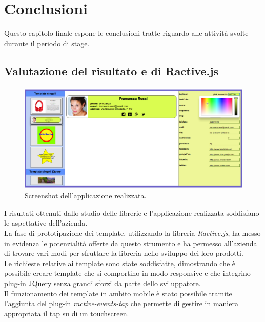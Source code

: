 
\chapter{Conclusioni}
\label{cap:conclusioni}

Questo capitolo finale espone le conclusioni tratte riguardo alle attività svolte durante il periodo di stage.

\section{Valutazione del risultato e di Ractive.js}
\begin{figure}[htp]
	\centering
	\includegraphics[scale=0.32]{../immagini/screenshot_app}
	\caption{Screenshot dell'applicazione realizzata.}
\end{figure}
I risultati ottenuti dallo studio delle librerie e l'applicazione realizzata soddisfano le aspettative dell'azienda.\\
La fase di prototipazione dei template, utilizzando la libreria \textit{Ractive.js}, ha messo in evidenza le potenzialità offerte da questo strumento e ha permesso all'azienda di trovare vari modi per sfruttare la libreria nello sviluppo dei loro prodotti.\\
Le richieste relative ai template sono state soddisfatte, dimostrando che è possibile creare template che si comportino in modo responsive e che integrino plug-in JQuery senza grandi sforzi da parte dello sviluppatore.\\
Il funzionamento dei template in ambito mobile è stato possibile tramite l'aggiunta del plug-in \textit{ractive-events-tap} che permette di gestire in maniera appropriata il tap su di un touchscreen.\\
